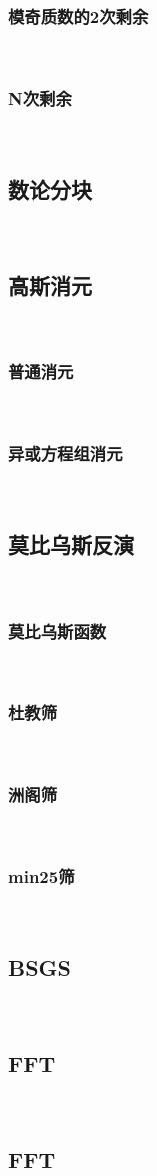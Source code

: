 \documentclass[twocolumn,a4]{article}
\newcommand{\addcpp}[1]{}
\begin{document}
		\subsubsection{模奇质数的2次剩余}
			\addcpp{math/Quadratic_residue}
​		\subsubsection{N次剩余}
​	\subsection{数论分块}
​		%
​	\subsection{高斯消元}
​		\subsubsection{普通消元}
​			%
​		\subsubsection{异或方程组消元}
​			%
​	\subsection{莫比乌斯反演}
​		\subsubsection{莫比乌斯函数}
​			%
​		\subsubsection{杜教筛}
​			%
​		\subsubsection{洲阁筛}
​			%
​		\subsubsection{min25筛}
​			%
​	\subsection{BSGS}
​		\addcpp{math/EXBSGS}
​	\subsection{FFT}
​		\subsection{FFT}
			\addcpp{math/FFT}
\end{document}
